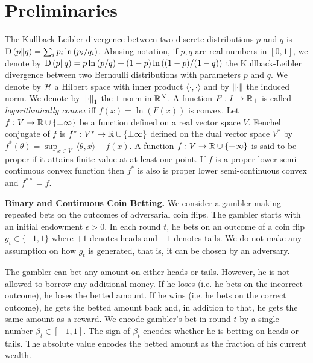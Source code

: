 \section{Preliminaries}

The Kullback-Leibler divergence between two discrete distributions $p$ and $q$
is $\operatorname*{D}\left({p}\middle\|{q}\right) = \sum_{i} p_i \ln\left( p_i/q_i \right)$. Abusing
notation, if $p,q$ are real numbers in $[0,1]$, we denote by $\operatorname*{D}\left({p}\middle\|{q}\right) = p \ln
\left(p/q \right) + (1-p) \ln \left((1-p)/(1-q) \right)$ the
Kullback-Leibler divergence between two Bernoulli distributions with parameters
$p$ and $q$.  We denote by $\mathcal{H}$ a Hilbert space with inner product $\langle
\cdot, \cdot\rangle$ and by $\left\|{\cdot}\right\|$ the induced norm.  We denote by
$\left\|{\cdot}\right\|_1$ the $1$-norm in $\mathbb{R}^N$.  A function $F:I \to \mathbb{R}_+$ is called
\emph{logarithmically convex} iff $f(x) = \ln(F(x))$ is convex.
Let $f:V \to \mathbb{R} \cup \{\pm\infty\}$ be a function defined on a real
vector space $V$. Fenchel conjugate of $f$ is $f^*:V^* \to \mathbb{R} \cup \{\pm
\infty\}$ defined on the dual vector space $V^*$ by $f^*(\theta) = \sup_{x \in
V} \ \langle \theta, x \rangle - f(x)$.  A function $f:V \to \mathbb{R} \cup \{+
\infty\}$ is said to be proper if  it attains finite
value at at least one point. If $f$ is a proper lower semi-continuous convex
function then $f^*$ is also is proper lower semi-continuous convex and
$f^{**}=f$.

\textbf{Binary and Continuous Coin Betting.} We consider a gambler making
repeated bets on the outcomes of adversarial coin flips. The gambler starts with an
initial endowment $\epsilon > 0$. In each round $t$, he bets on an outcome of a
coin flip $g_t \in \{-1,1\}$ where $+1$ denotes heads and $-1$ denotes tails.
We do not make any assumption on how $g_t$ is generated, that is, it can be
chosen by an adversary.

The gambler can bet any amount on either heads or tails. However, he is not
allowed to borrow any additional money. If he loses (i.e. he bets on the
incorrect outcome), he loses the betted amount. If he wins (i.e. he bets on the
correct outcome), he gets the betted amount back and, in addition to that, he
gets the same amount as a reward.  We encode gambler's bet in round $t$ by a
single number $\beta_t \in [-1,1]$. The sign of $\beta_t$ encodes whether he is
betting on heads or tails. The absolute value encodes the betted amount as the
fraction of his current wealth.

